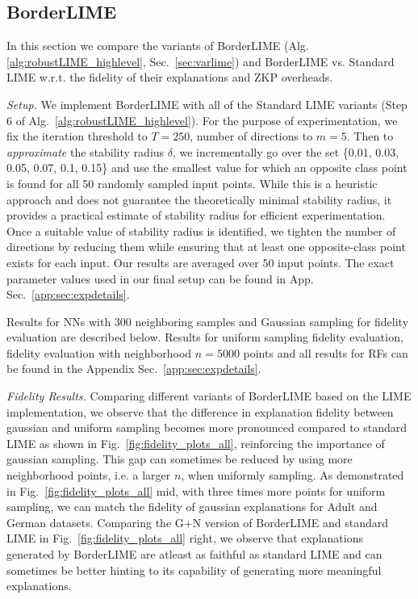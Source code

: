 \subsection{BorderLIME}\label{subsec:expborderlime}
In this section we compare the variants of BorderLIME (Alg.~ \ref{alg:robustLIME_highlevel}, Sec.~\ref{sec:varlime}) and BorderLIME vs. Standard LIME w.r.t. the fidelity of their explanations and ZKP overheads.

\textit{Setup.} We implement BorderLIME with all of the Standard LIME variants (Step 6 of Alg.~\ref{alg:robustLIME_highlevel}). For the purpose of experimentation, we fix the iteration threshold to $T=250$, number of directions to $m=5$. Then to \textit{approximate} the stability radius $\delta$, we incrementally go over the set \{0.01, 0.03, 0.05, 0.07, 0.1, 0.15\} and use the smallest value for which an opposite class point is found for all 50 randomly sampled input points. While this is a heuristic approach and does not guarantee the theoretically minimal stability radius, it provides a practical estimate of stability radius for efficient experimentation. Once a suitable value of stability radius is identified, we tighten the number of directions by reducing them while ensuring that at least one opposite-class point exists for each input. Our results are averaged over 50 input points. The exact parameter values used in our final setup can be found in App. Sec.~\ref{app:sec:expdetails}.



Results for NNs with 300 neighboring samples and Gaussian sampling for fidelity evaluation are described below. Results for uniform sampling fidelity evaluation, fidelity evaluation with neighborhood $n=5000$ points and all results for RFs can be found in the Appendix Sec.~\ref{app:sec:expdetails}.

\textit{Fidelity Results.} Comparing different variants of BorderLIME based on the LIME implementation, we observe that the difference in explanation fidelity between gaussian and uniform sampling becomes more pronounced compared to standard LIME as shown in Fig.~\ref{fig:fidelity_plots_all}, reinforcing the importance of gaussian sampling. This gap can sometimes be reduced by using more neighborhood points, i.e. a larger $n$, when uniformly sampling. As demonstrated in Fig.~\ref{fig:fidelity_plots_all} mid, with three times more points for uniform sampling, we can match the fidelity of gaussian explanations for Adult and German datasets. Comparing the G+N version of BorderLIME and standard LIME in Fig.~\ref{fig:fidelity_plots_all} right, we observe that explanations generated by BorderLIME are atleast as faithful as standard LIME and can sometimes be better hinting to its capability of generating more meaningful explanations.

